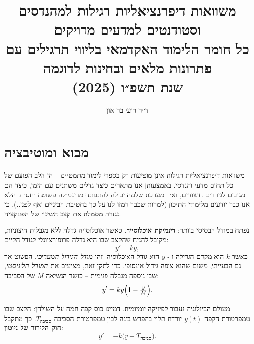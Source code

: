 \documentclass{article}
\numberwithin{equation}{section}
\begin{document}
\cleardoublepage
\pagestyle{fancy}
\fancyfoot[C]{\thepage}


    
\title{
\LARGE משוואות דיפרנציאליות רגילות למהנדסים וסטודנטים למדעים מדויקים\\[6pt]
\large כל חומר הלימוד האקדמאי בליווי תרגילים עם פתרונות מלאים ובחינות לדוגמה\\[4pt]
\LARGE שנת תשפ״ו (2025)
}

\author{\Large ד׳׳ר רועי בר-און} %
\date{}
\maketitle

\newpage

\tableofcontents

\newpage
{}

\section{מבוא ומוטיבציה}

משוואות דיפרנציאליות רגילות אינן מופיעות רק בספרי לימוד מתמטיים – הן הלב הפועם של כל תחום מדעי והנדסי.  
באמצעותן אנו מתארים כיצד גדלים משתנים עם הזמן, כיצד הם מגיבים לגירויים חיצוניים, ואיך מערכת שלמה יכולה להתפתח מדינמיקה פשוטה יחסית. הלא אנו כבר יודעים מלימודי התיכון (למרות שכבר רמזו לנו על כך בחטיבת הביניים ואף לפני..), כי נגזרת מסמלת את קצב השינוי של הפונקציה. 

נפתח במודל הבסיסי ביותר: \textbf{דינמיקת אוכלוסייה}.  
כאשר אוכלוסייה גדלה ללא מגבלות חיצוניות, מקובל להניח שהקצב שבו היא גדלה פרופורציונלי לגודל הקיים:
\[
y' = k y,
\]
כאשר $k$ הוא מקדם הגדילה ו - $y$ הוא גודל האוכלוסיה.
זהו \emph{מודל הגידול המעריכי}, הפשוט אך גם הבעייתי, משום שהוא צופה גידול אינסופי.  
כדי לתקן זאת, מציעים את \emph{המודל הלוגיסטי}, שבו נוספה מגבלה פנימית – כושר הנשיאה $M$ של הסביבה:
\[
y' = k y\Bigl(1-\tfrac{y}{M}\Bigr).
\]

מעולם הביולוגיה נעבור לפיזיקה יומיומית. דמיינו כוס קפה חמה על השולחן: הקצב שבו טמפרטורת הקפה $y(t)$ יורדת תלוי בהפרש בינה לבין טמפרטורת הסביבה $T_{\text{סביבה}}$.  
כך מתקבל \textbf{חוק הקירור של ניוטון}:
\[
y' = -k\big(y - T_{\text{סביבה}}\big).
\]
\end{document}
